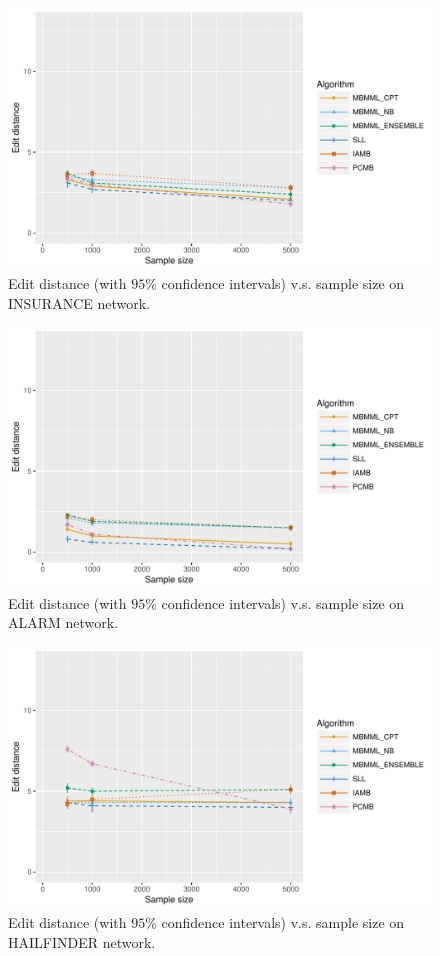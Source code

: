 \documentclass{svmult}
\begin{document}
\begin{figure}[hbt]
  \centering
    \includegraphics[scale=0.6]{figures/ed_vs_samplesize_insurance.pdf}
  \caption{Edit distance (with $95\%$ confidence intervals) v.s. sample size on INSURANCE network.}
\end{figure}

\begin{figure}[hbt]
  \centering
    \includegraphics[scale=0.6]{figures/ed_vs_samplesize_alarm.pdf}
  \caption{Edit distance (with $95\%$ confidence intervals) v.s. sample size on ALARM network.}
\end{figure}

\begin{figure}[hbt]
  \centering
    \includegraphics[scale=0.6]{figures/ed_vs_samplesize_hailfinder.pdf}
  \caption{Edit distance (with $95\%$ confidence intervals) v.s. sample size on HAILFINDER network.}
\end{figure}
\end{document}
